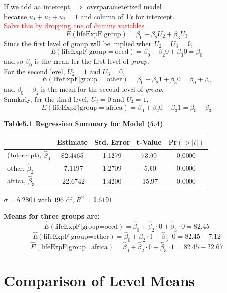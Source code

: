 \documentclass[14pt]{extarticle}
\begin{document}
\noindent
If we add an intercept, \(\Rightarrow\) overparameterized model \\
because \( u_1 + u_2 + u_3 = 1 \) and column of 1's for intercept. \\
\textcolor{red}{Solve this by dropping one of dummy variables.}
\[
E(\text{lifeExpF} | \text{group}) = \beta_0 + \beta_2 U_2 + \beta_3 U_3
\]
Since the first level of group will be implied when \(U_2 = U_3 = 0\),
\[
E(\text{lifeExpF} | \text{group} = \text{oecd}) = \beta_0 + \beta_2 0 + \beta_3 0 = \beta_0
\]
and so \(\beta_0\) is the mean for the first level of \textit{group}. \\
For the second level, \(U_2 = 1\) and \(U_3 = 0\),
\[
E(\text{lifeExpF} | \text{group} = \text{other}) = \beta_0 + \beta_2 1 + \beta_3 0 = \beta_0 + \beta_2
\]
and \(\beta_0 + \beta_2\) is the mean for the second level of \textit{group}. \\
Similarly, for the third level, \(U_2 = 0\) and \(U_3 = 1\),
\[
E(\text{lifeExpF} | \text{group} = \text{africa}) = \beta_0 + \beta_2 0 + \beta_3 1 = \beta_0 + \beta_3
\]
\begin{table}[H]
    \textbf{Table5.1 Regression Summary for Model (5.4)}
    \centering
    \begin{tabular}{lcccc}
    \toprule
     & \textbf{  Estimate  } & \textbf{ Std. Error } & \textbf{ t-Value } & \textbf{ Pr$(>|t|)$ } \\
    \midrule
    (Intercept), $\hat{\beta}_0$ & 82.4465 & 1.1279 & 73.09 & 0.0000 \\
    other, $\hat{\beta}_2$ & -7.1197 & 1.2709 & -5.60 & 0.0000 \\
    africa, $\hat{\beta}_3$ & -22.6742 & 1.4200 & -15.97 & 0.0000 \\
    \bottomrule
    \end{tabular}
    $\hat{\sigma} = 6.2801 \text{ with } 196 \text{ df, } R^2 = 0.6191$
\end{table}
\noindent
\textbf{Means for three groups are:}
\[
\hat{E}(\text{lifeExpF} | \text{group=oecd}) = \hat{\beta}_0 + \hat{\beta}_2 \cdot 0 + \hat{\beta}_3 \cdot 0 = 82.45
\]
\[
\hat{E}(\text{lifeExpF} | \text{group=other}) = \hat{\beta}_0 + \hat{\beta}_2 \cdot 1 + \hat{\beta}_3 \cdot 0 = 82.45 - 7.12
\]
\[
\hat{E}(\text{lifeExpF} | \text{group=africa}) = \hat{\beta}_0 + \hat{\beta}_2 \cdot 0 + \hat{\beta}_3 \cdot 1 = 82.45 - 22.67
\]    

\section*{Comparison of Level Means}
\end{document}
